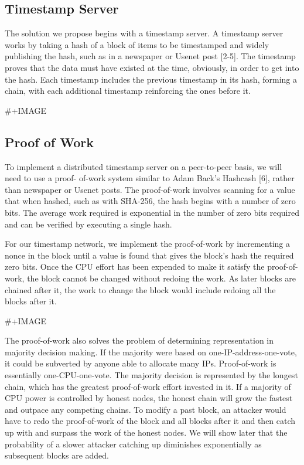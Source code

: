 \documentclass[11pt]{article}
\begin{document}
\subsection{Timestamp Server}
\label{sec:org9eea1e8}
The solution we propose begins with a timestamp server.
A timestamp server works by taking a hash of a block of items to be timestamped and widely publishing the hash, such as in a newspaper or Usenet post [2-5].
The timestamp proves that the data must have existed at the time, obviously, in order to get into the hash.
Each timestamp includes the previous timestamp in its hash, forming a chain, with each additional timestamp reinforcing the ones before it.

\#+IMAGE
\subsection{Proof of Work}
\label{sec:org3e0f47a}
To implement a distributed timestamp server on a peer-to-peer basis, we will need to use a proof- of-work system similar to Adam Back's Hashcash [6], rather than newspaper or Usenet posts.
The proof-of-work involves scanning for a value that when hashed, such as with SHA-256, the hash begins with a number of zero bits.
The average work required is exponential in the number of zero bits required and can be verified by executing a single hash.

For our timestamp network, we implement the proof-of-work by incrementing a nonce in the block until a value is found that gives the block's hash the required zero bits.
Once the CPU effort has been expended to make it satisfy the proof-of-work, the block cannot be changed without redoing the work.
As later blocks are chained after it, the work to change the block would include redoing all the blocks after it.

\#+IMAGE

The proof-of-work also solves the problem of determining representation in majority decision making.
If the majority were based on one-IP-address-one-vote, it could be subverted by anyone able to allocate many IPs.
Proof-of-work is essentially one-CPU-one-vote.
The majority decision is represented by the longest chain, which has the greatest proof-of-work effort invested in it.
If a majority of CPU power is controlled by honest nodes, the honest chain will grow the fastest and outpace any competing chains.
To modify a past block, an attacker would have to redo the proof-of-work of the block and all blocks after it and then catch up with and surpass the work of the honest nodes.
We will show later that the probability of a slower attacker catching up diminishes exponentially as subsequent blocks are added.
\end{document}
